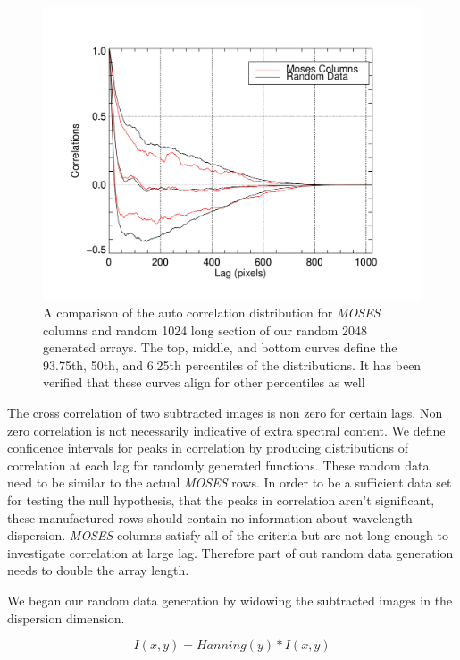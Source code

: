\documentclass[]{aastex6}
\begin{document}
\begin{figure}[t]
\centering
\includegraphics[scale=.5]{images/sigtestauto.pdf}
\caption{A comparison of the auto correlation distribution for \textit{MOSES} columns and random 1024 long section of our random 2048 generated arrays.  The top, middle, and bottom curves define the 93.75th, 50th, and 6.25th percentiles of the distributions.  It has been verified that these curves align for other percentiles as well}
\end{figure}	

The cross correlation of two subtracted images is non zero for certain lags. Non zero correlation is not necessarily indicative of extra spectral content.   We define confidence intervals for peaks in correlation by producing distributions of correlation at each lag for randomly generated functions.  These random data need to be similar to the actual \textit{MOSES} rows. In order to be a sufficient data set for testing the null hypothesis, that the peaks in correlation aren't significant, these manufactured rows should contain no information about wavelength dispersion.  \textit{MOSES} columns satisfy all of the criteria but are not long enough to investigate correlation at large lag. Therefore part of out random data generation needs to double the array length.

We began our random data generation by widowing the subtracted images in the dispersion dimension.

\begin{equation}
I(x,y) = Hanning(y)*I(x,y)
\end{equation}
\end{document}
